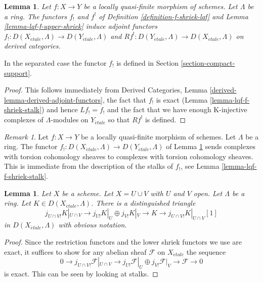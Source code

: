 \documentclass{stacks-project}
\theoremstyle{plain}
\newtheorem{lemma}[subsection]{Lemma}
\theoremstyle{definition}
\theoremstyle{remark}
\newtheorem{remark}[subsection]{Remark}
\numberwithin{equation}{subsection}
\def\etale{{\acute{e}tale}}
\begin{document}
\begin{lemma}
\label{lemma-lqf-shriek-derived}
Let $f : X \to Y$ be a locally quasi-finite morphism of schemes.
Let $\Lambda$ be a ring. The functors $f_!$ and $f^!$ of
Definition \ref{definition-f-shriek-lqf} and
Lemma \ref{lemma-lqf-f-upper-shriek}
induce adjoint functors $f_! : D(X_\etale, \Lambda) \to D(Y_\etale, \Lambda)$
and $Rf^! : D(Y_\etale, \Lambda) \to D(X_\etale, \Lambda)$
on derived categories.
\end{lemma}

\noindent
In the separated case the functor $f_!$ is defined in
Section \ref{section-compact-support}.

\begin{proof}
This follows immediately from
Derived Categories, Lemma \ref{derived-lemma-derived-adjoint-functors},
the fact that $f_!$ is exact (Lemma \ref{lemma-lqf-f-shriek-stalk})
and hence $Lf_! = f_!$
and the fact that we have enough K-injective complexes of $\Lambda$-modules
on $Y_\etale$ so that $Rf^!$ is defined.
\end{proof}

\begin{remark}
\label{remark-lqf-shriek-derived-torsion}
Let $f : X \to Y$ be a locally quasi-finite morphism of schemes. Let
$\Lambda$ be a ring. The functor
$f_! : D(X_\etale, \Lambda) \to D(Y_\etale, \Lambda)$ of
Lemma \ref{lemma-lqf-shriek-derived}
sends complexes with torsion cohomology sheaves
to complexes with torsion cohomology sheaves.
This is immediate from the description of the stalks of $f_!$,
see Lemma \ref{lemma-lqf-f-shriek-stalk}.
\end{remark}

\begin{lemma}
\label{lemma-mayer-vietoris-shriek}
Let $X$ be a scheme. Let $X = U \cup V$ with $U$ and $V$ open.
Let $\Lambda$ be a ring. Let $K \in D(X_\etale, \Lambda)$. There
is a distinguished triangle
$$
j_{U \cap V!}K|_{U \cap V} \to
j_{U!}K|_U \oplus j_{V!}K|_V \to K \to 
j_{U \cap V!}K|_{U \cap V}[1]
$$
in $D(X_\etale, \Lambda)$ with obvious notation.
\end{lemma}

\begin{proof}
Since the restriction functors and the lower shriek functors we use
are exact, it suffices to show for any abelian sheaf $\mathcal{F}$ on
$X_\etale$ the sequence
$$
0 \to j_{U \cap V!}\mathcal{F}|_{U \cap V} \to
j_{U!}\mathcal{F}|_U \oplus j_{V!}\mathcal{F}|_V \to \mathcal{F} \to 0
$$
is exact. This can be seen by looking at stalks.
\end{proof}
\end{document}
